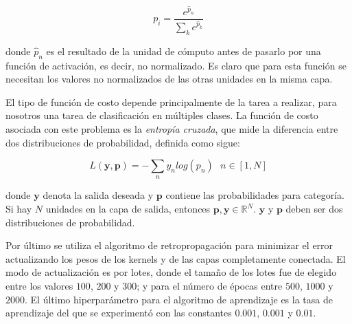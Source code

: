 \[
p_i = \frac{e^{\hat{p}_n}}{\sum_k e^{\hat{p}_k}}
\]

donde $\hat{p}_n$ es el resultado de la unidad de cómputo antes de pasarlo
por una función de activación, es decir, no normalizado. Es claro
que para esta función se necesitan los valores no normalizados
de las otras unidades en la misma capa.

El tipo de función de costo depende principalmente de la tarea a realizar,
para nosotros una tarea de clasificación en múltiples clases. La función
de costo asociada con este problema es la \textit{entropía cruzada},
que mide la diferencia entre dos distribuciones de probabilidad,
definida como sigue:

\[
L(\mathbf{y}, \mathbf{p}) = - \sum_{n} y_n log(p_n) \text{		} n \in [1,N]
\]

donde $\mathbf{y}$ denota la salida deseada y $\mathbf{p}$ contiene las probabilidades
para categoría. Si hay $N$ unidades en la capa de salida, entonces
$\mathbf{p}, \mathbf{y} \in \mathbb{R}^N$. $\mathbf{y}$ y $\mathbf{p}$ deben ser dos distribuciones de probabilidad.

Por último se utiliza el algoritmo de retropropagación para
minimizar el error actualizando los pesos de los kernels y de las capas
completamente conectada. El modo de actualización es por lotes, 
donde el tamaño de los lotes fue de elegido entre los valores 
$100$, $200$ y $300$; y
para el número de épocas entre $500$, $1000$ y $2000$.
El último hiperparámetro para el algoritmo de aprendizaje es la tasa
de aprendizaje del que se experimentó con las constantes $0.001$,
$0.001$ y $0.01$.

